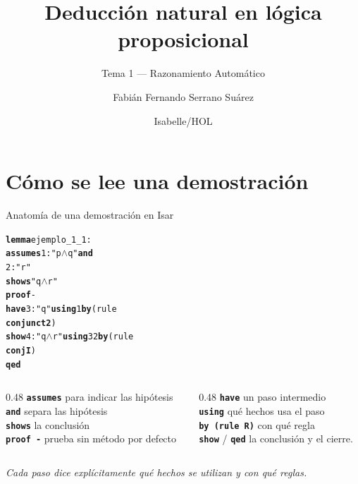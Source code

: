 \documentclass[11pt,aspectratio=169]{beamer}
\title{Deducción natural en lógica proposicional}
\subtitle{Tema 1 --- Razonamiento Automático}
\author{Fabián Fernando Serrano Suárez}
\institute{Ciencias de la Computación}
\date{Isabelle/HOL}
\newcommand{\sAnd}{\(\wedge\)}
\newcommand{\kw}[1]{\textcolor{isaCmd}{\textbf{#1}}}
\newcommand{\str}[1]{\textcolor{isaStr}{#1}}
\newcommand{\R}[1]{{\setlength{\fboxsep}{1pt}%
  \colorbox{resalte}{\ttfamily\bfseries\textcolor{granate}{#1}}}}
\newcommand{\nota}[1]{{\small\itshape\color{gray} #1}}
\begin{document}
\maketitle

\section{Cómo se lee una demostración}

\begin{frame}[fragile]{Anatomía de una demostración en Isar}
\begin{alltt}\footnotesize
\kw{lemma} ejemplo_1_1:
  \kw{assumes} 1: \str{"p \sAnd{} q"} \kw{and}
          2: \str{"r"}
  \kw{shows} \str{"q \sAnd{} r"}
\kw{proof} -
  \kw{have} 3: \str{"q"} \kw{using} 1 \kw{by} (rule \R{conjunct2})
  \kw{show} 4: \str{"q \sAnd{} r"} \kw{using} 3 2 \kw{by} (rule \R{conjI})
\kw{qed}
\end{alltt}
  
  \vspace{-0.4em}
  \begin{columns}[t]
    \begin{column}{0.48\textwidth}
      \small
      \texttt{{\bf{assumes}}} \quad para indicar las hipótesis\\
      \texttt{{\bf{and}}} \quad separa las hipótesis\\
      \texttt{{\bf{shows}}} \quad la conclusión\\
      \texttt{{\bf{proof -}}} \quad prueba sin método por defecto
    \end{column}
    \begin{column}{0.48\textwidth}
      \small
      \texttt{{\bf{have}}} \quad un paso intermedio\\
      \texttt{{\bf{using}}} \quad qué hechos usa el paso\\
      \texttt{\bf{by (rule R)}} \quad con qué regla\\
      \texttt{{\bf{show}}} / \texttt{{\bf{qed}}} \quad la conclusión y el cierre.
    \end{column}
  \end{columns}
  \vspace{0.6em}
  
  \nota{Cada paso dice explícitamente \alert{qué hechos se utilizan} y \alert{con qué reglas}.}
\end{frame}
\end{document}
